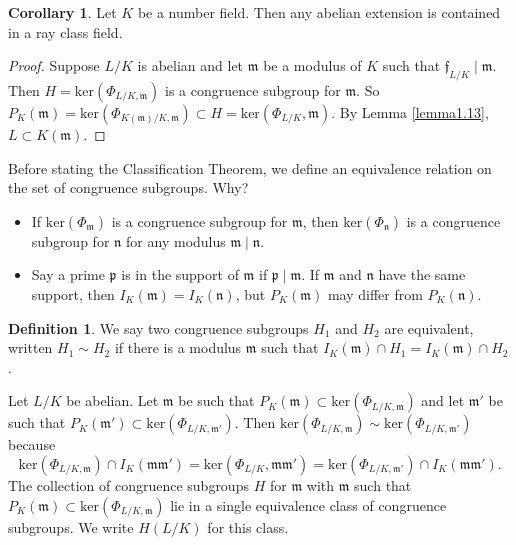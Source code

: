\documentclass{article}
\theoremstyle{definition}
\newtheorem{cor}[theorem]{Corollary}
\newtheorem{defn}[theorem]{Definition}
\begin{document}
\begin{cor}
    Let $K$ be a number field. Then any abelian extension is contained in a ray class field.
\end{cor}
\begin{proof}
    Suppose $L/K$ is abelian and let $\mathfrak{m}$ be a modulus of $K$ such that $\mathfrak{f}_{L/K} \mid  \mathfrak{m}$. Then $H = \text{ker}(\Phi_{L/K,\mathfrak{m}})$ is a congruence subgroup for $\mathfrak{m}$. So $P_K(\mathfrak{m}) = \text{ker}(\Phi_{K(\mathfrak{m})/K,\mathfrak{m}}) \subset H = \text{ker}(\Phi_{L/K},\mathfrak{m})$. By Lemma \ref{lemma1.13}, $L \subset K(\mathfrak{m})$.
\end{proof}

Before stating the Classification Theorem, we define an equivalence relation on the set of congruence subgroups. Why? 
\begin{itemize}
    \item If $\text{ker}(\Phi_\mathfrak{m})$ is a congruence subgroup for $\mathfrak{m}$, then $\text{ker}(\Phi_{\mathfrak{n}})$ is a congruence subgroup for $\mathfrak{n}$ for any modulus $\mathfrak{m} \mid  \mathfrak{n}$.
    \item Say a prime $\mathfrak{p}$ is in the support of $\mathfrak{m}$ if $\mathfrak{p} \mid \mathfrak{m}$. If $\mathfrak{m}$ and $\mathfrak{n}$ have the same support, then $I_K(\mathfrak{m}) = I_K(\mathfrak{n})$, but $P_K(\mathfrak{m})$ may differ from $P_K(\mathfrak{n})$.
\end{itemize}
\begin{defn}
    We say two congruence subgroups $H_1$ and $H_2$ are equivalent, written $H_1 \sim H_2$ if there is a modulus $\mathfrak{m}$ such that $I_K(\mathfrak{m}) \cap H_1 = I_K(\mathfrak{m}) \cap H_2$.
\end{defn}
Let $L/K$ be abelian. Let $\mathfrak{m}$ be such that $P_K(\mathfrak{m}) \subset \text{ker}(\Phi_{L/K,\mathfrak{m}})$ and let $\mathfrak{m}'$ be such that $P_K(\mathfrak{m}') \subset \text{ker}(\Phi_{L/K,\mathfrak{m}'})$. Then $\text{ker}(\Phi_{L/K,\mathfrak{m}}) \sim \text{ker}(\Phi_{L/K,\mathfrak{m}'})$ because $$\text{ker}(\Phi_{L/K,\mathfrak{m}}) \cap I_K(\mathfrak{m}\mathfrak{m}') = \text{ker}(\Phi_{L/K},\mathfrak{m}\mathfrak{m}') = \text{ker}(\Phi_{L/K,\mathfrak{m}'}) \cap I_K(\mathfrak{m}\mathfrak{m}').$$ 
The collection of congruence subgroups $H$ for $\mathfrak{m}$ with $\mathfrak{m}$ such that $P_K(\mathfrak{m}) \subset \text{ker}(\Phi_{L/K,\mathfrak{m}})$ lie in a single equivalence class of congruence subgroups. We write $H(L/K)$ for this class.
\end{document}
